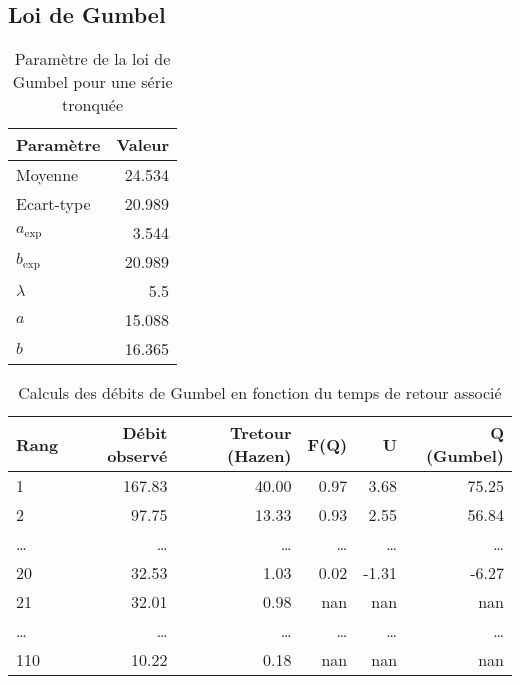 \subsection{Loi de Gumbel}
\begin{table}[H]
    \centering
    \begin{tabular}{l|r}
        \toprule
        \textbf{Paramètre} & \textbf{Valeur} \\
        \midrule
        Moyenne            & 24.534          \\
        Ecart-type         & 20.989          \\
        \midrule
        $a_\text{exp}$     & 3.544           \\
        $b_\text{exp}$     & 20.989          \\
        \midrule
        $\lambda$          & 5.5             \\
        $a$                & 15.088          \\
        $b$                & 16.365          \\
        \bottomrule
    \end{tabular}
    \caption{Paramètre de la loi de Gumbel pour une série tronquée}
    \label{tab:param_Gumbel_tronquees}
\end{table}

\begin{table}[H]
    \centering
    \begin{tabular}{l|r|r|r|r|r}
        \toprule
        \textbf{Rang} & \textbf{Débit observé} & \textbf{Tretour (Hazen)} & \textbf{F(Q)} & \textbf{U} & \textbf{Q (Gumbel)} \\
        \midrule
        1             & 167.83                 & 40.00                    & 0.97          & 3.68       & 75.25               \\
        2             & 97.75                  & 13.33                    & 0.93          & 2.55       & 56.84               \\
        \dots         & \dots                  & \dots                    & \dots         & \dots      & \dots               \\
        20            & 32.53                  & 1.03                     & 0.02          & -1.31      & -6.27               \\
        21            & 32.01                  & 0.98                     & nan           & nan        & nan                 \\
        \dots         & \dots                  & \dots                    & \dots         & \dots      & \dots               \\
        110           & 10.22                  & 0.18                     & nan           & nan        & nan                 \\
        \bottomrule
    \end{tabular}
    \caption{Calculs des débits de Gumbel en fonction du temps de retour associé}
    \label{tab:gumbelcalcul_tronquees}
\end{table}

